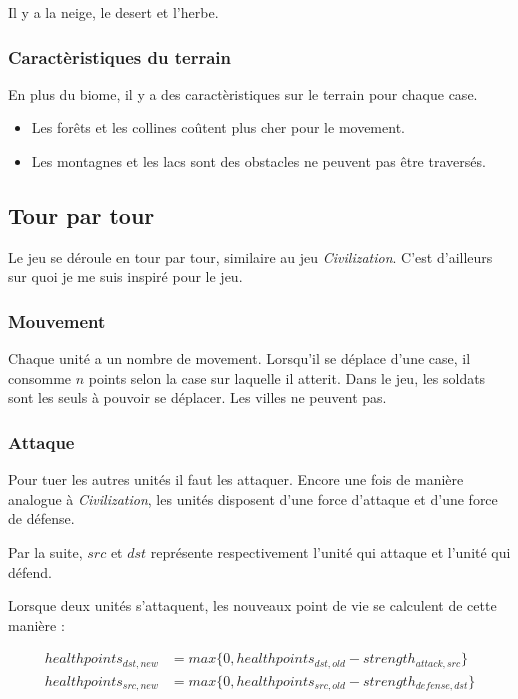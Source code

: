 \documentclass{article}
\begin{document}
Il y a la neige, le desert et l'herbe.

\subsubsection{Caractèristiques du terrain}
En plus du biome, il y a des caractèristiques sur le terrain pour chaque case.

\begin{itemize}
    \item Les forêts et les collines coûtent plus cher pour le movement.
    \item Les montagnes et les lacs sont des obstacles ne peuvent pas être traversés.
\end{itemize}

\subsection{Tour par tour}
Le jeu se déroule en tour par tour, similaire au jeu \textit{Civilization}. C'est d'ailleurs
sur quoi je me suis inspiré pour le jeu.

\subsubsection{Mouvement}

Chaque unité a un nombre de movement. Lorsqu'il se déplace d'une case, il consomme $n$ points selon la case sur laquelle il atterit.
Dans le jeu, les soldats sont les seuls à pouvoir se déplacer. Les villes ne peuvent pas.

\subsubsection{Attaque}
Pour tuer les autres unités il faut les attaquer. Encore une fois de manière analogue à \textit{Civilization},
les unités disposent d'une force d'attaque et d'une force de défense.

Par la suite, $src$ et $dst$ représente respectivement l'unité qui attaque et l'unité
qui défend.

Lorsque deux unités s'attaquent, les nouveaux point de vie se calculent de cette manière : 

\begin{align}
    healthpoints_{dst,new} &= max \{0,healthpoints_{dst,old} - strength_{attack,src}\} \\
    healthpoints_{src,new} &= max \{0,healthpoints_{src,old} - strength_{defense,dst}\}
\end{align}
\end{document}
